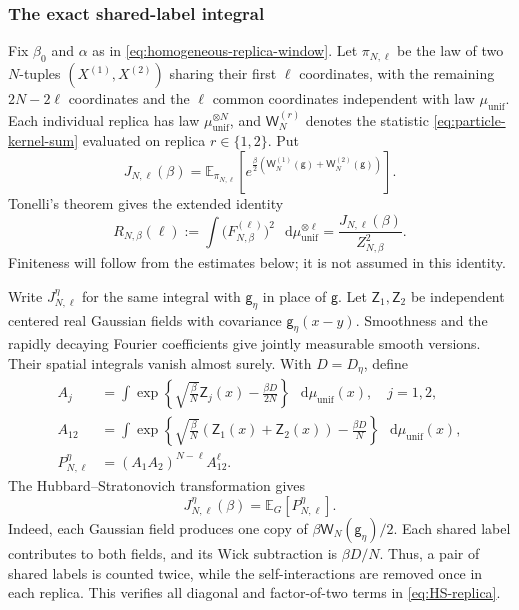 \documentclass[11pt,reqno]{amsart}
\numberwithin{equation}{section}
\theoremstyle{plain}
\theoremstyle{definition}
\newcommand{\dd}{\mathop{}\!\mathrm d}
\newcommand{\E}{\mathbb E}
\newcommand{\be}{\beta}
\newcommand{\g}{\mathsf g}
\newcommand{\muunif}{\mu_{\mathrm{unif}}}
\begin{document}
\subsubsection{The exact shared-label integral}
Fix $\be_0$ and $\alpha$ as in \eqref{eq:homogeneous-replica-window}. Let $\pi_{N,\ell}$ be the law of two $N$-tuples $(X^{(1)},X^{(2)})$ sharing their first $\ell$ coordinates, with the remaining $2N-2\ell$ coordinates and the $\ell$ common coordinates independent with law $\muunif$.  Each individual replica has law $\muunif^{\otimes N}$, and $\mathsf W_N^{(r)}$ denotes the statistic \eqref{eq:particle-kernel-sum} evaluated on replica $r\in\{1,2\}$.  Put
\begin{equation}\label{eq:J}
 J_{N,\ell}(\be)
 =\E_{\pi_{N,\ell}}\!\left[
 e^{\frac\be2(\mathsf W_N^{(1)}(\g)+\mathsf W_N^{(2)}(\g))}\right].
\end{equation}
Tonelli's theorem gives the extended identity
\begin{equation}\label{eq:replica-identity}
 R_{N,\be}(\ell):=\int\bigl(F_{N,\be}^{(\ell)}\bigr)^2\,\dd \muunif^{\otimes\ell}
 =\frac{J_{N,\ell}(\be)}{Z_{N,\be}^2}.
\end{equation}
Finiteness will follow from the estimates below; it is not assumed in this identity.

Write $J_{N,\ell}^{\eta}$ for the same integral with $\g_\eta$ in place of $\g$.  Let $\mathsf Z_1,\mathsf Z_2$ be independent centered real Gaussian fields with covariance $\g_\eta(x-y)$.  Smoothness and the rapidly decaying Fourier coefficients give jointly measurable smooth versions.  Their spatial integrals vanish almost surely.  With $D=D_\eta$, define
\begin{align}
 A_j&=\int\exp\!\left\{\sqrt{\frac\be N}\mathsf Z_j(x)-\frac{\be D}{2N}\right\}\,\dd \muunif(x),\quad j=1,2,\label{eq:Aj}\\
 A_{12}&=\int\exp\!\left\{\sqrt{\frac\be N}(\mathsf Z_1(x)+\mathsf Z_2(x))-
 \frac{\be D}{N}\right\}\,\dd \muunif(x),\label{eq:A12}\\
 P_{N,\ell}^{\eta}&=(A_1A_2)^{N-\ell}A_{12}^{\ell}.\label{eq:P}
\end{align}
The Hubbard--Stratonovich transformation gives
\begin{equation}\label{eq:HS-replica}
 J_{N,\ell}^{\eta}(\be)=\E_G[P_{N,\ell}^{\eta}].
\end{equation}
Indeed, each Gaussian field produces one copy of $\be\mathsf W_N(\g_\eta)/2$.  Each shared label contributes to both fields, and its Wick subtraction is $\be D/N$.  Thus, a pair of shared labels is counted twice, while the self-interactions are removed once in each replica.  This verifies all diagonal and factor-of-two terms in \eqref{eq:HS-replica}.
\end{document}
